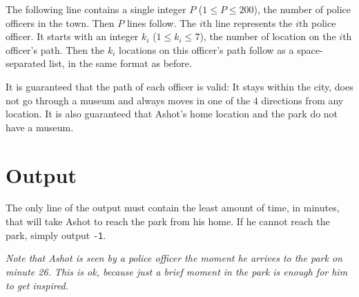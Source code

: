 The following line contains a single integer $P$ ($1 \leq P \leq 200$), the number of police officers in the town.
Then $P$ lines follow.
The $i$th line represents the $i$th police officer.
It starts with an integer $k_i$ ($1 \leq k_i \leq 7$), the number of location on the $i$th officer's path.
Then the $k_i$ locations on this officer's path follow as a space-separated list, in the same format as before.

It is guaranteed that the path of each officer is valid: It stays within the city, does not go through a museum and always moves in one of the $4$ directions from any location.
It is also guaranteed that Ashot's home location and the park do not have a museum.

\section*{Output}
The only line of the output must contain the least amount of time, in minutes, that will take Ashot to reach the park from his home.
If he cannot reach the park, simply output \texttt{-1}.
{
\emph{Note that Ashot is seen by a police officer the moment he arrives to the park on minute 26.
This is ok, because just a brief moment in the park is enough for him to get inspired.}

}
